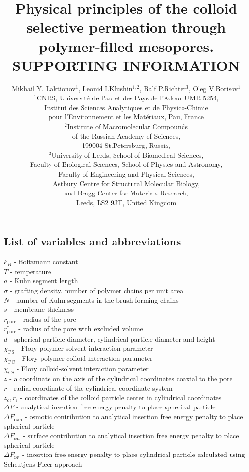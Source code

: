 \documentclass[12pt, a4paper]{article}
\title{Physical principles of the colloid selective permeation through polymer-filled mesopores.\\
        SUPPORTING INFORMATION}
\author{Mikhail Y. Laktionov$^1$, Leonid I.Klushin$^{1,2}$, Ralf P.Richter$^3$, Oleg V.Borisov$^1$\\
$^{1}$CNRS, Universit\'e de Pau et des Pays de l'Adour UMR 5254,\\
Institut des Sciences Analytiques et de Physico-Chimie\\
pour l'Environnement et les Mat\'eriaux, Pau, France \\
$^{2}$Institute of Macromolecular Compounds \\
of the Russian Academy of Sciences, \\
199004 St.Petersburg, Russia,\\
$^{3}$University of Leeds, School of Biomedical Sciences, \\
Faculty of Biological Sciences, 
School of Physics and Astronomy, \\
Faculty of Engineering and Physical Sciences,\\  
Astbury Centre for Structural Molecular Biology,\\ 
and Bragg Center for Materials Research,\\ 
Leeds, LS2 9JT, United Kingdom}
\begin{document}
\maketitle

\subsection*{List of variables and abbreviations}
$k_B$ - Boltzmann constant \\
$T$ - temperature \\
$a$ - Kuhn segment length \\
$\sigma$ - grafting density, number of polymer chains per unit area \\
$N$ - number of Kuhn segments in the brush forming chains \\
$s$ - membrane thickness \\
$r_{\textrm{pore}}$ - radius of the pore \\
$r^{\ast}_{\textrm{pore}}$ - radius of the pore with excluded volume \\
$d$ - spherical particle diameter, cylindrical particle diameter and height \\ 
$\chi_{\textrm{PS}}$ - Flory polymer-solvent interaction parameter  \\
$\chi_{\textrm{PC}}$ - Flory polymer-colloid interaction parameter  \\
$\chi_{\textrm{CS}}$ - Flory colloid-solvent interaction parameter  \\
$z$ - a coordinate on the axis of the cylindrical coordinates coaxial to the pore \\
$r$ - radial coordinate of the cylindrical coordinate system \\
$z_{c}, r_{c}$ - coordinates of the colloid particle center in cylindrical coordinates \\
$\Delta F$ - analytical insertion free energy penalty to place spherical particle \\
$\Delta F_{\textrm{osm}}$ - osmotic contribution to analytical insertion free energy penalty to place spherical particle \\
$\Delta F_{\textrm{sur}}$ - surface contribution to analytical insertion free energy penalty to place spherical particle \\
$\Delta F_{\textrm{SF}}$ - insertion free energy penalty to place cylindrical particle calculated using Scheutjens-Fleer approach \\
\end{document}
